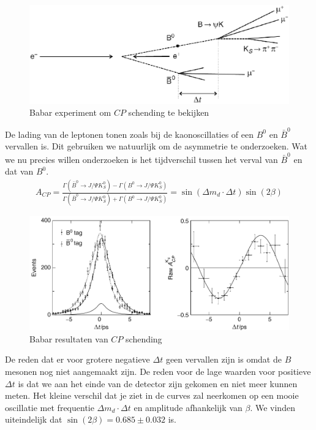 \documentclass[../main.tex]{subfiles}
\begin{document}
\begin{figure}[h]
    \centering
    \includegraphics[width=0.6\linewidth]{cp_violation/babar.png}
    \caption{Babar experiment om $CP$ schending te bekijken}%
    \label{fig:cp_violation/babar}
\end{figure}

De lading van de leptonen tonen zoals bij de kaonoscillaties of een $B^0$ en $\bar{B}^0$ vervallen is. Dit gebruiken we natuurlijk om de asymmetrie te onderzoeken. Wat we nu precies willen onderzoeken is het tijdverschil tussen het verval van $\bar{B}^0$ en dat van $B^0$.
\begin{equation}
    \begin{aligned}
        \label{eq:cp_asymmetrie}
        A_{C P}=\frac{\Gamma\left(\bar{B}^{0} \rightarrow J / \Psi K_{S}^{0}\right)-\Gamma\left(B^{0} \rightarrow J / \Psi K_{S}^{0}\right)}{\Gamma\left(\bar{B}^{0} \rightarrow J / \Psi K_{S}^{0}\right)+\Gamma\left(B^{0} \rightarrow J / \Psi K_{S}^{0}\right)}=\sin \left(\Delta m_{d} \cdot \Delta t\right) \sin (2 \beta)
    \end{aligned}
\end{equation}

\begin{figure}[h]
    \centering
    \includegraphics[width=0.6\linewidth]{cp_violation/babar_results.png}
    \caption{Babar resultaten van $CP$ schending}%
    \label{fig:cp_violation/babar_results}
\end{figure}

De reden dat er voor grotere negatieve $\Delta t$ geen vervallen zijn is omdat de $B$ mesonen nog niet aangemaakt zijn. De reden voor de lage waarden voor positieve $\Delta t$ is dat we aan het einde van de detector zijn gekomen en niet meer kunnen meten. Het kleine verschil dat je ziet in de curves zal neerkomen op een mooie oscillatie met frequentie $\Delta m_d \cdot \Delta t$ en amplitude afhankelijk van $\beta$. We vinden uiteindelijk dat $\sin (2 \beta)=0.685 \pm 0.032$ is.
\end{document}
